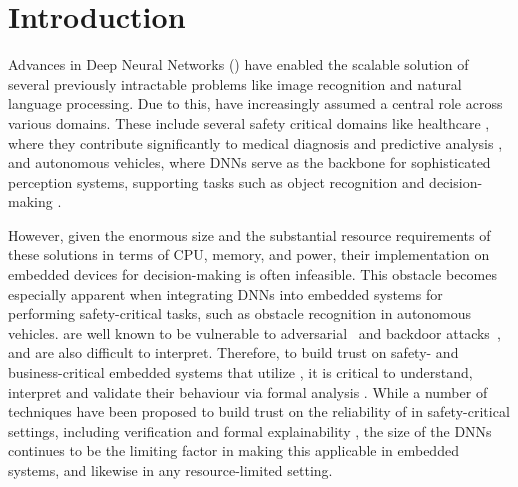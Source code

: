 
\section{Introduction}

Advances in Deep Neural Networks (\dnn) have enabled the scalable solution of
several previously intractable problems like image recognition and natural
language processing. Due to this, \dnn have increasingly assumed a central role
across various domains. These include several safety critical domains like
healthcare \cite{b1}, where they contribute significantly to medical
diagnosis and predictive analysis \cite{b2}, and autonomous vehicles, where
DNNs serve as the backbone for sophisticated perception systems, supporting
tasks such as object recognition and decision-making \cite{b3}. 

However, given the enormous size and the substantial resource requirements of
these \dnn solutions in terms of CPU, memory, and power, their implementation
on embedded devices for decision-making is often infeasible.  This obstacle
becomes especially apparent when integrating DNNs into embedded systems for
performing safety-critical tasks, such as obstacle recognition in autonomous
vehicles. \dnn are well known to be vulnerable to adversarial~\cite{l-bfgs,
fgsm, deep-fool, pgd, ground-truth-adv-attack, cw-attack} and backdoor
attacks~\cite{backdoor-poisoning}, and are also difficult to interpret.
Therefore, to build trust on safety- and business-critical embedded systems
that utilize \dnn, it is critical to understand, interpret and validate their
behaviour via formal analysis \cite{overview-fxai, minimal-image-fxai,
backdoor-verification, nn-lander-verif, camera-verif-dsouza,
generalization-verif}. While a number of techniques have been proposed to build
trust on the reliability of \dnn in safety-critical settings, including
verification \cite{reluplex, deeppoly, crown, beta-crown, cegar-nn}  and formal
explainability \cite{overview-fxai, minimal-image-fxai}, the size of the DNNs
continues to be the limiting factor in making this applicable in embedded
systems, and likewise in any resource-limited setting.


